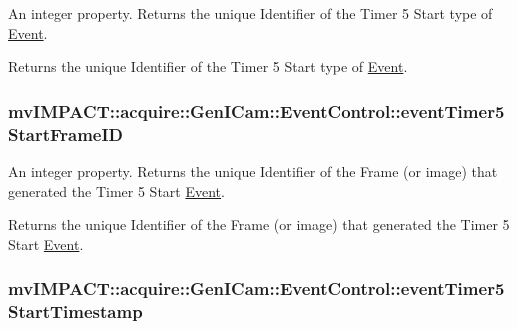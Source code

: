 An integer property. Returns the unique Identifier of the Timer 5 Start type of \hyperlink{classmv_i_m_p_a_c_t_1_1acquire_1_1_event}{Event}. 

Returns the unique Identifier of the Timer 5 Start type of \hyperlink{classmv_i_m_p_a_c_t_1_1acquire_1_1_event}{Event}. \hypertarget{classmv_i_m_p_a_c_t_1_1acquire_1_1_gen_i_cam_1_1_event_control_ac68a2858057c8ccae312c2024635fea5}{
\subsubsection[{event\+Timer5\+Start\+Frame\+I\+D}]{ mv\+I\+M\+P\+A\+C\+T\+::acquire\+::\+Gen\+I\+Cam\+::\+Event\+Control\+::event\+Timer5\+Start\+Frame\+I\+D}}\label{classmv_i_m_p_a_c_t_1_1acquire_1_1_gen_i_cam_1_1_event_control_ac68a2858057c8ccae312c2024635fea5}


An integer property. Returns the unique Identifier of the Frame (or image) that generated the Timer 5 Start \hyperlink{classmv_i_m_p_a_c_t_1_1acquire_1_1_event}{Event}. 

Returns the unique Identifier of the Frame (or image) that generated the Timer 5 Start \hyperlink{classmv_i_m_p_a_c_t_1_1acquire_1_1_event}{Event}. \hypertarget{classmv_i_m_p_a_c_t_1_1acquire_1_1_gen_i_cam_1_1_event_control_ad451a75efbf561375f24d1dbe61f9414}{
\subsubsection[{event\+Timer5\+Start\+Timestamp}]{ mv\+I\+M\+P\+A\+C\+T\+::acquire\+::\+Gen\+I\+Cam\+::\+Event\+Control\+::event\+Timer5\+Start\+Timestamp}}\label{classmv_i_m_p_a_c_t_1_1acquire_1_1_gen_i_cam_1_1_event_control_ad451a75efbf561375f24d1dbe61f9414}


